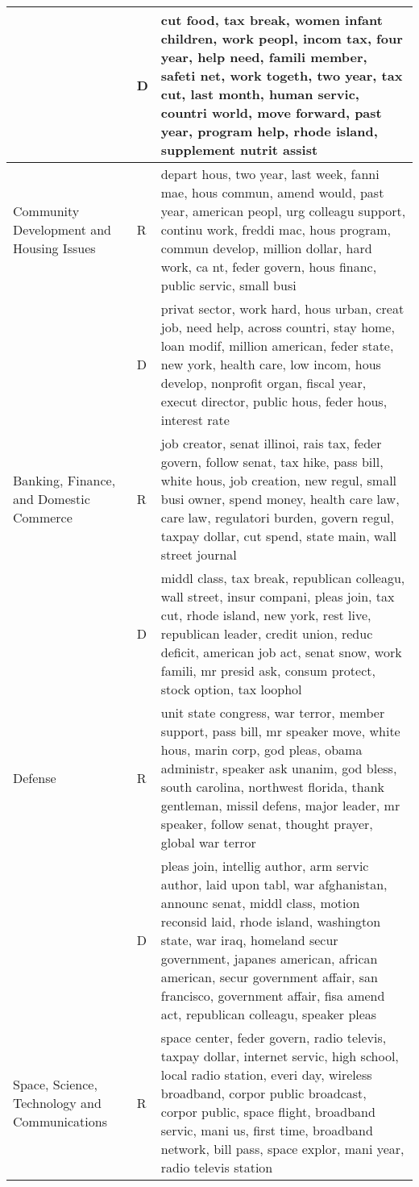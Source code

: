 \begin{longtable}{p{}p{}p{}}
   & D & cut food, tax break, women infant children, work peopl, incom tax, four year, help need, famili member, safeti net, work togeth, two year, tax cut, last month, human servic, countri world, move forward, past year, program help, rhode island, supplement nutrit assist \\ 
   \hline
Community Development and Housing Issues & R & depart hous, two year, last week, fanni mae, hous commun, amend would, past year, american peopl, urg colleagu support, continu work, freddi mac, hous program, commun develop, million dollar, hard work, ca nt, feder govern, hous financ, public servic, small busi \\ 
   & D & privat sector, work hard, hous urban, creat job, need help, across countri, stay home, loan modif, million american, feder state, new york, health care, low incom, hous develop, nonprofit organ, fiscal year, execut director, public hous, feder hous, interest rate \\ 
   \hline
Banking, Finance, and Domestic Commerce & R & job creator, senat illinoi, rais tax, feder govern, follow senat, tax hike, pass bill, white hous, job creation, new regul, small busi owner, spend money, health care law, care law, regulatori burden, govern regul, taxpay dollar, cut spend, state main, wall street journal \\ 
   & D & middl class, tax break, republican colleagu, wall street, insur compani, pleas join, tax cut, rhode island, new york, rest live, republican leader, credit union, reduc deficit, american job act, senat snow, work famili, mr presid ask, consum protect, stock option, tax loophol \\ 
   \hline
Defense & R & unit state congress, war terror, member support, pass bill, mr speaker move, white hous, marin corp, god pleas, obama administr, speaker ask unanim, god bless, south carolina, northwest florida, thank gentleman, missil defens, major leader, mr speaker, follow senat, thought prayer, global war terror \\ 
   & D & pleas join, intellig author, arm servic author, laid upon tabl, war afghanistan, announc senat, middl class, motion reconsid laid, rhode island, washington state, war iraq, homeland secur government, japanes american, african american, secur government affair, san francisco, government affair, fisa amend act, republican colleagu, speaker pleas \\ 
   \hline
Space, Science, Technology and Communications & R & space center, feder govern, radio televis, taxpay dollar, internet servic, high school, local radio station, everi day, wireless broadband, corpor public broadcast, corpor public, space flight, broadband servic, mani us, first time, broadband network, bill pass, space explor, mani year, radio televis station \\ 

\end{longtable}
